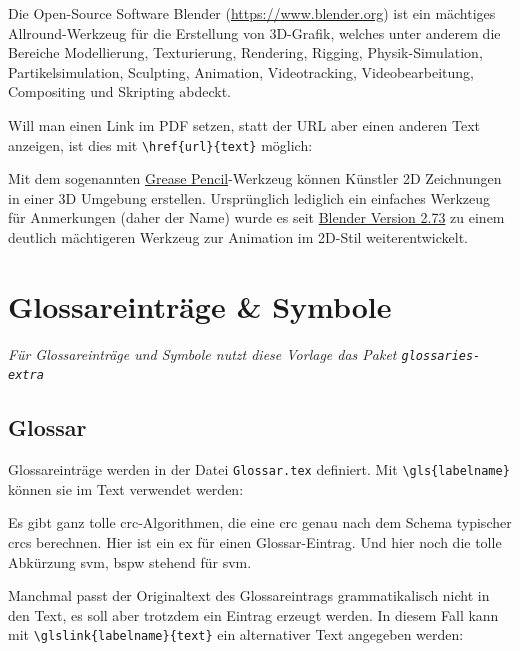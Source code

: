		\begin{vorlagenbeispiel}
			Die Open-Source Software Blender (\url{https://www.blender.org}) ist ein mächtiges Allround-Werkzeug für die Erstellung von 3D-Grafik, welches unter anderem die Bereiche Modellierung, Texturierung, Rendering, Rigging, Physik-Simulation, Partikelsimulation, Sculpting, Animation, Videotracking, Videobearbeitung, Compositing und Skripting abdeckt.
		\end{vorlagenbeispiel}
		\medskip

		Will man einen Link im PDF setzen, statt der URL aber einen anderen Text anzeigen, ist dies mit \lstinline[language=thesis-latexbeispiel]|\href{url}{text}| möglich:
%		
		\begin{vorlagenbeispiel}
			Mit dem sogenannten \href{https://www.blender.org/features/grease-pencil/}{Grease Pencil}-Werkzeug können Künstler 2D Zeichnungen in einer 3D Umgebung erstellen.
			Ursprünglich lediglich ein einfaches Werkzeug für Anmerkungen (daher der Name) wurde es seit \href{https://www.blender.org/download/releases/2-73/}{Blender Version 2.73} zu einem deutlich mächtigeren Werkzeug zur Animation im 2D-Stil weiterentwickelt.
		\end{vorlagenbeispiel}		
		
	\section{Glossareinträge \& Symbole}
		\emph{Für Glossareinträge und Symbole nutzt diese Vorlage das Paket \lstinline|glossaries-extra|}
		\medskip
		
		\subsection{Glossar}
			Glossareinträge werden in der Datei \lstinline|Glossar.tex| definiert. Mit \lstinline[language=thesis-latexbeispiel]|\gls{labelname}| können sie im Text verwendet werden:
			
			\begin{vorlagenbeispiel}
				Es gibt ganz tolle \gls{crc}-Algorithmen, die eine \gls{crc} genau nach dem Schema typischer \glspl{crc} berechnen.
				Hier ist ein \gls{ex} für einen Glossar-Eintrag. 
				Und hier noch die tolle Abkürzung \gls{svm}, \gls{bspw} stehend für \gls{svm}.
			\end{vorlagenbeispiel}
			
			Manchmal passt der Originaltext des Glossareintrags grammatikalisch nicht in den Text, es soll aber trotzdem ein Eintrag erzeugt werden.
			In diesem Fall kann mit 			\lstinline[language=thesis-latexbeispiel]|\glslink{labelname}{text}| ein alternativer Text angegeben werden:
			
